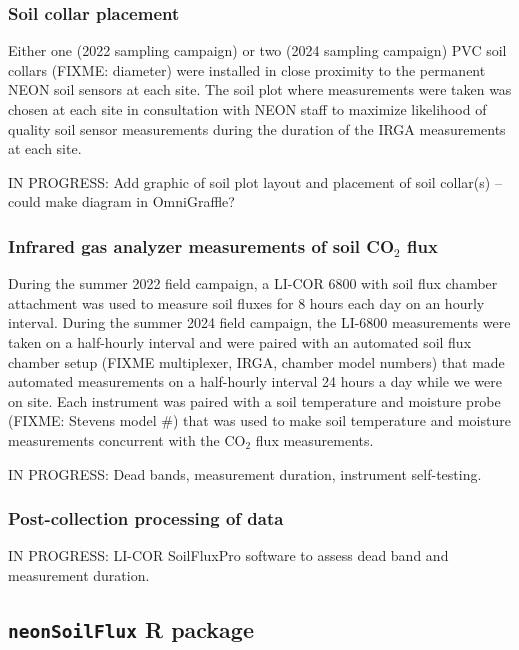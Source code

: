 \documentclass[
  letterpaper,
  DIV=11,
  numbers=noendperiod]{scrartcl}
\begin{document}
\normalsize

\subsubsection{Soil collar placement}\label{soil-collar-placement}

Either one (2022 sampling campaign) or two (2024 sampling campaign) PVC
soil collars (FIXME: diameter) were installed in close proximity to the
permanent NEON soil sensors at each site. The soil plot where
measurements were taken was chosen at each site in consultation with
NEON staff to maximize likelihood of quality soil sensor measurements
during the duration of the IRGA measurements at each site.

IN PROGRESS: Add graphic of soil plot layout and placement of soil
collar(s) -- could make diagram in OmniGraffle?

\subsubsection{\texorpdfstring{Infrared gas analyzer measurements of
soil CO\(_{2}\)
flux}{Infrared gas analyzer measurements of soil CO\_\{2\} flux}}\label{infrared-gas-analyzer-measurements-of-soil-co_2-flux}

During the summer 2022 field campaign, a LI-COR 6800 with soil flux
chamber attachment was used to measure soil fluxes for 8 hours each day
on an hourly interval. During the summer 2024 field campaign, the
LI-6800 measurements were taken on a half-hourly interval and were
paired with an automated soil flux chamber setup (FIXME multiplexer,
IRGA, chamber model numbers) that made automated measurements on a
half-hourly interval 24 hours a day while we were on site. Each
instrument was paired with a soil temperature and moisture probe (FIXME:
Stevens model \#) that was used to make soil temperature and moisture
measurements concurrent with the CO\(_{2}\) flux measurements.

IN PROGRESS: Dead bands, measurement duration, instrument self-testing.

\subsubsection{Post-collection processing of
data}\label{post-collection-processing-of-data}

IN PROGRESS: LI-COR SoilFluxPro software to assess dead band and
measurement duration.

\subsection{\texorpdfstring{\texttt{neonSoilFlux} R
package}{neonSoilFlux R package}}\label{neonsoilflux-r-package}
\end{document}
